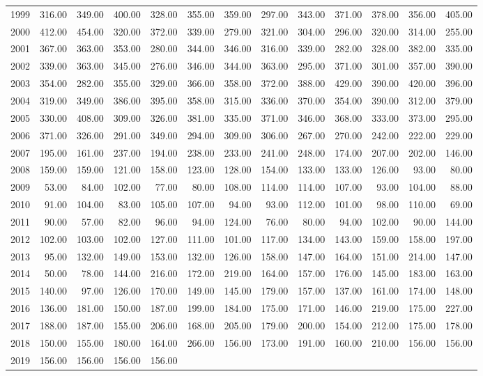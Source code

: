 \begin{longtable}{rrrrrrrrrrrrr}
  1999 & 316.00 & 349.00 & 400.00 & 328.00 & 355.00 & 359.00 & 297.00 & 343.00 & 371.00 & 378.00 & 356.00 & 405.00 \\ 
  2000 & 412.00 & 454.00 & 320.00 & 372.00 & 339.00 & 279.00 & 321.00 & 304.00 & 296.00 & 320.00 & 314.00 & 255.00 \\ 
  2001 & 367.00 & 363.00 & 353.00 & 280.00 & 344.00 & 346.00 & 316.00 & 339.00 & 282.00 & 328.00 & 382.00 & 335.00 \\ 
  2002 & 339.00 & 363.00 & 345.00 & 276.00 & 346.00 & 344.00 & 363.00 & 295.00 & 371.00 & 301.00 & 357.00 & 390.00 \\ 
  2003 & 354.00 & 282.00 & 355.00 & 329.00 & 366.00 & 358.00 & 372.00 & 388.00 & 429.00 & 390.00 & 420.00 & 396.00 \\ 
  2004 & 319.00 & 349.00 & 386.00 & 395.00 & 358.00 & 315.00 & 336.00 & 370.00 & 354.00 & 390.00 & 312.00 & 379.00 \\ 
  2005 & 330.00 & 408.00 & 309.00 & 326.00 & 381.00 & 335.00 & 371.00 & 346.00 & 368.00 & 333.00 & 373.00 & 295.00 \\ 
  2006 & 371.00 & 326.00 & 291.00 & 349.00 & 294.00 & 309.00 & 306.00 & 267.00 & 270.00 & 242.00 & 222.00 & 229.00 \\ 
  2007 & 195.00 & 161.00 & 237.00 & 194.00 & 238.00 & 233.00 & 241.00 & 248.00 & 174.00 & 207.00 & 202.00 & 146.00 \\ 
  2008 & 159.00 & 159.00 & 121.00 & 158.00 & 123.00 & 128.00 & 154.00 & 133.00 & 133.00 & 126.00 & 93.00 & 80.00 \\ 
  2009 & 53.00 & 84.00 & 102.00 & 77.00 & 80.00 & 108.00 & 114.00 & 114.00 & 107.00 & 93.00 & 104.00 & 88.00 \\ 
  2010 & 91.00 & 104.00 & 83.00 & 105.00 & 107.00 & 94.00 & 93.00 & 112.00 & 101.00 & 98.00 & 110.00 & 69.00 \\ 
  2011 & 90.00 & 57.00 & 82.00 & 96.00 & 94.00 & 124.00 & 76.00 & 80.00 & 94.00 & 102.00 & 90.00 & 144.00 \\ 
  2012 & 102.00 & 103.00 & 102.00 & 127.00 & 111.00 & 101.00 & 117.00 & 134.00 & 143.00 & 159.00 & 158.00 & 197.00 \\ 
  2013 & 95.00 & 132.00 & 149.00 & 153.00 & 132.00 & 126.00 & 158.00 & 147.00 & 164.00 & 151.00 & 214.00 & 147.00 \\ 
  2014 & 50.00 & 78.00 & 144.00 & 216.00 & 172.00 & 219.00 & 164.00 & 157.00 & 176.00 & 145.00 & 183.00 & 163.00 \\ 
  2015 & 140.00 & 97.00 & 126.00 & 170.00 & 149.00 & 145.00 & 179.00 & 157.00 & 137.00 & 161.00 & 174.00 & 148.00 \\ 
  2016 & 136.00 & 181.00 & 150.00 & 187.00 & 199.00 & 184.00 & 175.00 & 171.00 & 146.00 & 219.00 & 175.00 & 227.00 \\ 
  2017 & 188.00 & 187.00 & 155.00 & 206.00 & 168.00 & 205.00 & 179.00 & 200.00 & 154.00 & 212.00 & 175.00 & 178.00 \\ 
  2018 & 150.00 & 155.00 & 180.00 & 164.00 & 266.00 & 156.00 & 173.00 & 191.00 & 160.00 & 210.00 & 156.00 & 156.00 \\ 
  2019 & 156.00 & 156.00 & 156.00 & 156.00 &  &  &  &  &  &  &  &  \\ 
   \hline
\hline
\end{longtable}
